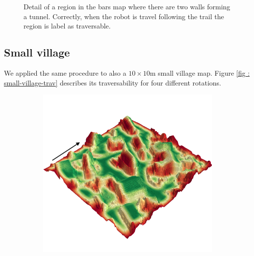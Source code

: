 \documentclass[../document.tex]{subfiles}
\begin{document}
\begin{figure} [htbp]
\begin{subfigure}[b]{0.23\textwidth}
  \end{subfigure}
  \caption{Detail of a region in the bars map where there are two walls forming a tunnel. Correctly, when the robot is travel following the trail the region is label as traversable.}
  \label{fig : bars-tunnel-trav}
  \end{figure}

\subsection{Small village}
We applied the same procedure to also a $10\times10$m small village map. Figure \ref{fig : small-village-trav} describes its traversability for four different rotations.

\begin{figure} [htbp]
  \centering
  \begin{subfigure}[b]{0.45\textwidth}
    \includegraphics[width=\linewidth]{../img/4/traversability/sullens/-270.png} 
  \end{subfigure}
  \begin{subfigure}[b]{0.45\textwidth}

\end{subfigure}
\end{figure}
\end{document}

